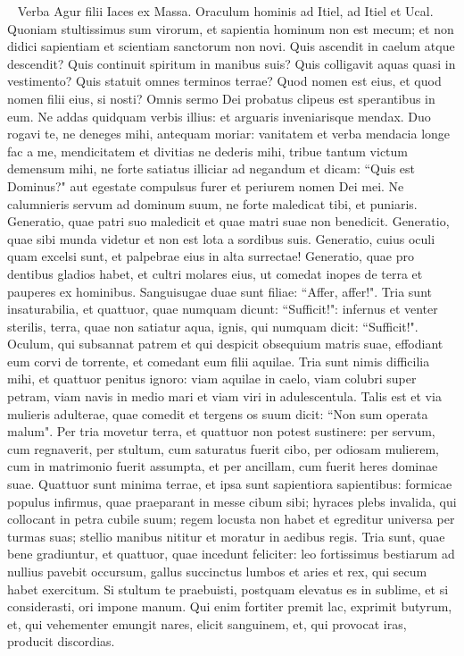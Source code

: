 \begin{biblechapter}   
\verse Verba Agur filii Iaces ex Massa. Oraculum hominis ad Itiel, ad Itiel et Ucal. 
\verse Quoniam stultissimus sum virorum, et sapientia hominum non est mecum; 
\verse et non didici sapientiam et scientiam sanctorum non novi. 
\verse Quis ascendit in caelum atque descendit? Quis continuit spiritum in manibus suis? Quis colligavit aquas quasi in vestimento? Quis statuit omnes terminos terrae? Quod nomen est eius, et quod nomen filii eius, si nosti? 
\verse Omnis sermo Dei probatus clipeus est sperantibus in eum. 
\verse Ne addas quidquam verbis illius: et arguaris inveniarisque mendax. 
\verse Duo rogavi te, ne deneges mihi, antequam moriar: 
\verse vanitatem et verba mendacia longe fac a me, mendicitatem et divitias ne dederis mihi, tribue tantum victum demensum mihi, 
\verse ne forte satiatus illiciar ad negandum et dicam: “Quis est Dominus?" aut egestate compulsus furer et periurem nomen Dei mei. 
\verse Ne calumnieris servum ad dominum suum, ne forte maledicat tibi, et puniaris. 
\verse Generatio, quae patri suo maledicit et quae matri suae non benedicit. 
\verse Generatio, quae sibi munda videtur et non est lota a sordibus suis. 
\verse Generatio, cuius oculi quam excelsi sunt, et palpebrae eius in alta surrectae! 
\verse Generatio, quae pro dentibus gladios habet, et cultri molares eius, ut comedat inopes de terra et pauperes ex hominibus. 
\verse Sanguisugae duae sunt filiae: “Affer, affer!". Tria sunt insaturabilia, et quattuor, quae numquam dicunt: “Sufficit!": 
\verse infernus et venter sterilis, terra, quae non satiatur aqua, ignis, qui numquam dicit: “Sufficit!". 
\verse Oculum, qui subsannat patrem et qui despicit obsequium matris suae, effodiant eum corvi de torrente, et comedant eum filii aquilae. 
\verse Tria sunt nimis difficilia mihi, et quattuor penitus ignoro: 
\verse viam aquilae in caelo, viam colubri super petram, viam navis in medio mari et viam viri in adulescentula. 
\verse Talis est et via mulieris adulterae, quae comedit et tergens os suum dicit: “Non sum operata malum". 
\verse Per tria movetur terra, et quattuor non potest sustinere: 
\verse per servum, cum regnaverit, per stultum, cum saturatus fuerit cibo, 
\verse per odiosam mulierem, cum in matrimonio fuerit assumpta, et per ancillam, cum fuerit heres dominae suae. 
\verse Quattuor sunt minima terrae, et ipsa sunt sapientiora sapientibus: 
\verse formicae populus infirmus, quae praeparant in messe cibum sibi; 
\verse hyraces plebs invalida, qui collocant in petra cubile suum; 
\verse regem locusta non habet et egreditur universa per turmas suas; 
\verse stellio manibus nititur et moratur in aedibus regis. 
\verse Tria sunt, quae bene gradiuntur, et quattuor, quae incedunt feliciter: 
\verse leo fortissimus bestiarum ad nullius pavebit occursum, 
\verse gallus succinctus lumbos et aries et rex, qui secum habet exercitum. 
\verse Si stultum te praebuisti, postquam elevatus es in sublime, et si considerasti, ori impone manum. 
\verse Qui enim fortiter premit lac, exprimit butyrum, et, qui vehementer emungit nares, elicit sanguinem, et, qui provocat iras, producit discordias. 
\end{biblechapter}

